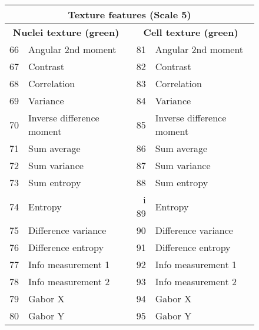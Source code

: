 \documentclass[oneside, a4paper, draft]{memoir} %
\begin{document}
\begin{figure}[here]
\begin{tabularx}{300pt}{|rX|rX|}
	\multicolumn{4}{c}{Texture features (Scale 5)}\\
	\hline
	\multicolumn{2}{|c|}{\textbf{Nuclei texture (green)}} &
	\multicolumn{2}{c|}{\textbf{Cell texture (green)}}\\
	\hline
	66 & Angular 2nd moment & 			81 & Angular 2nd moment \\
	67 & Contrast & 					82 & Contrast \\
	68 & Correlation & 					83 & Correlation \\
	69 & Variance & 					84 & Variance \\
	70 & Inverse difference moment & 	85 & Inverse difference moment \\
	71 & Sum average & 					86 & Sum average \\
	72 & Sum variance & 				87 & Sum variance \\
	73 & Sum entropy & 					88 & Sum entropy \\
	74 & Entropy & i					89 & Entropy \\
	75 & Difference variance & 			90 & Difference variance \\
	76 & Difference entropy & 			91 & Difference entropy \\
	77 & Info measurement 1 & 			92 & Info measurement 1 \\
	78 & Info measurement 2 & 			93 & Info measurement 2 \\
	79 & Gabor X & 						94 & Gabor X \\
	80 & Gabor Y & 						95 & Gabor Y \\
	\hline
\end{tabularx}

\end{figure}
\end{document}
